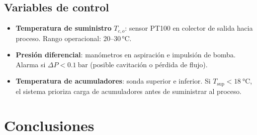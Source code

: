 \documentclass[11pt,a4paper]{article}
\begin{document}
\subsection{Variables de control}

\begin{itemize}
  \item \textbf{Temperatura de suministro} $T_{c,o}$: sensor PT100 en colector de salida
        hacia proceso. Rango operacional: 20–30\,°C.
  \item \textbf{Presión diferencial}: manómetros en aspiración e impulsión de bomba.
        Alarma si $\Delta P < \SI{0.1}{\bar}$ (posible cavitación o pérdida de flujo).
  \item \textbf{Temperatura de acumuladores}: sonda superior e inferior. Si
        $T_{\text{sup}} < \SI{18}{\celsius}$, el sistema prioriza carga de acumuladores
        antes de suministrar al proceso.
\end{itemize}


\section{Conclusiones}
\end{document}
